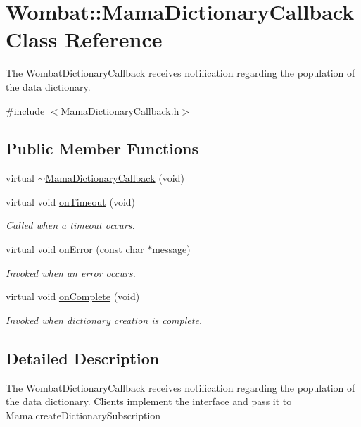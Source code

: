 \hypertarget{classWombat_1_1MamaDictionaryCallback}{
\section{Wombat::MamaDictionaryCallback Class Reference}
\label{classWombat_1_1MamaDictionaryCallback}
}


The {\ttfamily WombatDictionaryCallback} receives notification regarding the population of the data dictionary.  


{\ttfamily \#include $<$MamaDictionaryCallback.h$>$}\subsection*{Public Member Functions}
\begin{DoxyCompactItemize}
\item 
virtual \hyperlink{classWombat_1_1MamaDictionaryCallback_a5395bc3242fe2651bcfaefcf60b7375f}{$\sim$MamaDictionaryCallback} (void)
\item 
virtual void \hyperlink{classWombat_1_1MamaDictionaryCallback_a61cce11968f309a252e76c93c5125ecd}{onTimeout} (void)
\begin{DoxyCompactList}\small\item\em Called when a timeout occurs. \item\end{DoxyCompactList}\item 
virtual void \hyperlink{classWombat_1_1MamaDictionaryCallback_aad56e9347966d44cb361d0881507a0b2}{onError} (const char $\ast$message)
\begin{DoxyCompactList}\small\item\em Invoked when an error occurs. \item\end{DoxyCompactList}\item 
virtual void \hyperlink{classWombat_1_1MamaDictionaryCallback_a233a98b2d67b54037975db88ba72fabe}{onComplete} (void)
\begin{DoxyCompactList}\small\item\em Invoked when dictionary creation is complete. \item\end{DoxyCompactList}\end{DoxyCompactItemize}


\subsection{Detailed Description}
The {\ttfamily WombatDictionaryCallback} receives notification regarding the population of the data dictionary. Clients implement the interface and pass it to {\ttfamily Mama.createDictionarySubscription}

